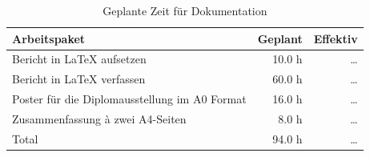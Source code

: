   \begin{table}[htb]
    \sffamily 
    \begin{center}
      \begin{tabular}{p{9cm}rr}
        \toprule
        \textbf{Arbeitspaket} & \textbf{Geplant} & \textbf{Effektiv} \\
        \midrule
        Bericht in \LaTeX{} aufsetzen &
        10.0 h &
        \ldots\\
        Bericht in \LaTeX{} verfassen &
        60.0 h &
        \ldots\\
        Poster für die Diplomausstellung im A0 Format &
        16.0 h &
        \ldots\\
        Zusammenfassung à zwei A4-Seiten &
        8.0 h &
        \ldots\\
        \bottomrule
        Total &
        94.0 h &
        \ldots\\
        \bottomrule
      \end{tabular}
      \caption{Geplante Zeit für Dokumentation}
      \label{tab:documentationPlaning}
    \end{center}
  \end{table}
  
